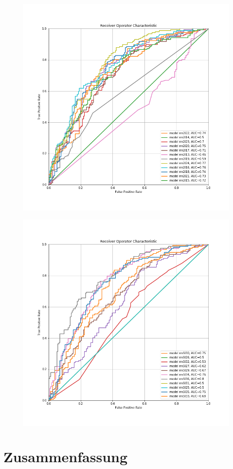 \documentclass{article}
\begin{document}
\begin{figure}
\centering
\includegraphics[scale=0.5]{../rocNN2L.png}
\end{figure}

\begin{figure}
\centering
\includegraphics[scale=0.5]{../rocNN5L.png}
\end{figure}


\section{Zusammenfassung}
\end{document}
